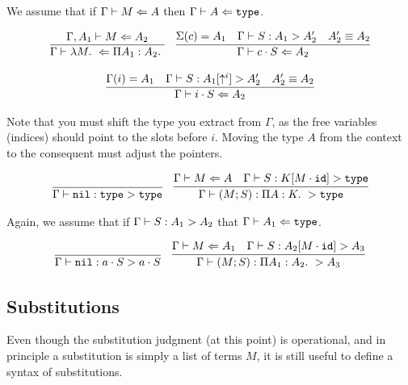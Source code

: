 \documentclass[11pt,twoside]{article}
\begin{document}
\bigskip 
{}
\bigskip 

We assume that if $\Gamma\vdash M \Leftarrow A$ then $\Gamma\vdash A \Leftarrow \mathtt{type}$.

$$
\begin{array}{cc}
\infer{\CheckTy{\Lam{M}}{\PiTyp{A_1}{A_2}}}{\CheckTy[\Gamma,A_1]{M}{A_2}} &
\infer{\CheckTy{c\cdot S}{A_2}}{\Sigma(c)=A_1 & \Focus{S}{A_1}{A_2'} & \Equiv{A_2'}{A_2}} \\\\
\multicolumn{2}{c}{\infer{\CheckTy{i\cdot S}{A_2}}{\Gamma(i)=A_1 & \Focus{S}{A_1[\Shift^i]}{A_2'} & \Equiv{A_2'}{A_2}}}
\end{array} 
$$

\bigskip 

Note that you must shift the type you extract from $\Gamma$, as the
free variables (indices) should point to the slots before $i$.  Moving
the type $A$ from the context to the consequent must adjust the pointers.

\bigskip 
{}
\bigskip 

$$
\begin{array}{lr}
\infer{\Focus{\Nil}{\Type}{\Type}}{} & 
\infer{\Focus{(M;S)}{\PiTyp{A}{K}}{\Type}}{\CheckTy{M}{A} & \Focus{S}{K[M\cdot\IdSub]}{\Type}}
\end{array} 
$$

\bigskip 
{}
\bigskip 

Again, we assume that if $\Gamma\vdash S : A_1 > A_2$ that $\Gamma\vdash A_1 \Leftarrow \mathtt{type}$.

$$
\begin{array}{lr}
\infer{\Focus{\Nil}{a\cdot S}{a\cdot S}}{} & 
\infer{\Focus{(M;S)}{\PiTyp{A_1}{A_2}}{A_3}}{\CheckTy{M}{A_1} & \Focus{S}{A_2[M\cdot\IdSub]}{A_3}}
\end{array} 
$$



\subsection{Substitutions}

Even though the substitution judgment (at this point) is operational,
and in principle a substitution is simply a list of terms $M$,
it is still useful to define a syntax of substitutions.  
\end{document}
